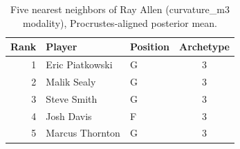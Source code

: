 \begin{table}[htbp]
  \centering\small
  \begin{tabular}{rllc}
    \toprule
    Rank & Player & Position & Archetype \\
    \midrule
    1 & Eric Piatkowski & G & 3 \\
    2 & Malik Sealy & G & 3 \\
    3 & Steve Smith & G & 3 \\
    4 & Josh Davis & F & 3 \\
    5 & Marcus Thornton & G & 3 \\
    \bottomrule
  \end{tabular}
  \caption{Five nearest neighbors of Ray Allen (curvature_m3 modality), Procrustes-aligned posterior mean.}
  \label{tab:Ray_Allen_neighbors_curvature_m3}
\end{table}

